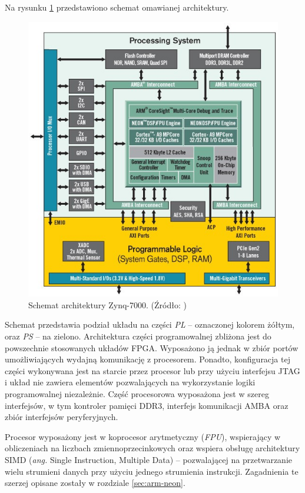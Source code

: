 Na rysunku \ref{fig:zynq-overview} przedstawiono schemat omawianej architektury.

\begin{figure}[h]
	\centering
	\includegraphics[width=12cm]{img/zyng-platform.png}
	\caption{Schemat architektury Zynq-7000. (Źródło: \cite{zybo-reference-manual})}
	\label{fig:zynq-overview}
\end{figure}

Schemat przedstawia podział układu na części \emph{PL} -- oznaczonej kolorem żółtym, oraz \emph{PS} -- na zielono.
Architektura części programowalnej zbliżona jest do powszechnie stosowanych układów FPGA. %
Wyposażono ją jednak w zbiór portów umożliwiających wydajną komunikację z procesorem. 
Ponadto, konfiguracja tej części wykonywana jest na starcie przez procesor lub przy użyciu interfejsu JTAG i układ nie zawiera elementów pozwalających na wykorzystanie logiki programowalnej niezależnie.
Część procesorowa wyposażona jest w szereg interfejsów, w tym kontroler pamięci DDR3, interfejs komunikacji AMBA oraz zbiór interfejsów peryferyjnych.

Procesor wyposażony jest w koprocesor arytmetyczny (\emph{FPU}), wspierający w obliczeniach na liczbach zmiennoprzecinkowych oraz wspiera obsługę architektury SIMD (\emph{ang.} Single Instruction, Multiple Data) -- pozwalającej na przetwarzanie wielu strumieni danych przy użyciu jednego strumienia instrukcji. 
Zagadnienia te szerzej opisane zostały w rozdziale \ref{sec:arm-neon}.

